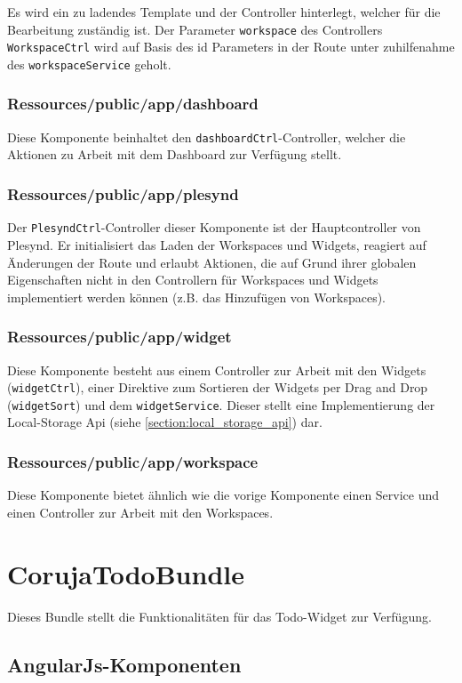 Es wird ein zu ladendes Template und der Controller hinterlegt, welcher für die Bearbeitung zuständig ist. Der Parameter \texttt{workspace} des Controllers \texttt{WorkspaceCtrl} wird auf Basis des id Parameters in der Route unter zuhilfenahme des \texttt{workspaceService} geholt. 
\subsubsection{Ressources/public/app/dashboard}
Diese Komponente beinhaltet den \texttt{dashboardCtrl}-Controller, welcher die Aktionen zu Arbeit mit dem Dashboard zur Verfügung stellt.

\subsubsection{Ressources/public/app/plesynd}
Der \texttt{PlesyndCtrl}-Controller dieser Komponente ist der Hauptcontroller von Plesynd. Er initialisiert das Laden der Workspaces und Widgets, reagiert auf Änderungen der Route und erlaubt Aktionen, die auf Grund ihrer globalen Eigenschaften nicht in den Controllern für Workspaces und Widgets implementiert werden können (z.B. das Hinzufügen von Workspaces).

\subsubsection{Ressources/public/app/widget}
Diese Komponente besteht aus einem Controller zur Arbeit mit den Widgets (\texttt{widgetCtrl}), einer Direktive zum Sortieren der Widgets per Drag and Drop (\texttt{widgetSort}) und dem \texttt{widgetService}. Dieser stellt eine Implementierung der Local-Storage Api (siehe \ref{section:local_storage_api}) dar.

\subsubsection{Ressources/public/app/workspace}
Diese Komponente bietet ähnlich wie die vorige Komponente einen Service und einen Controller zur Arbeit mit den Workspaces.

\section{CorujaTodoBundle}
Dieses Bundle stellt die Funktionalitäten für das Todo-Widget zur Verfügung.

\subsection{AngularJs-Komponenten}

